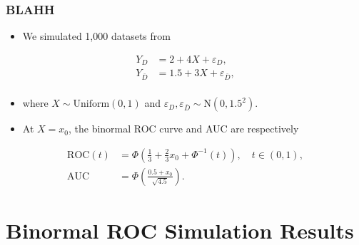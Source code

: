 \documentclass[t]{beamer}
\begin{document}
\begin{frame}
	\frametitle{BLAHH}
	\begin{itemize}
		\item We simulated 1,000 datasets from
	\end{itemize}
\begin{align*}
Y_D &= 2 + 4X + \varepsilon_D, \\
Y_{\bar{D}} &= 1.5 + 3X + \varepsilon_{\bar{D}}, \\
\end{align*}
\vspace{-.4in}
\begin{itemize}
	\item[] where $X \sim \text{Uniform}(0, 1)$ and $\varepsilon_{D}, \varepsilon_{\bar{D}} \sim \text{N}(0, 1.5^2)$.
	\item At $X = x_0$, the binormal ROC curve and AUC are respectively 
\end{itemize}
\begin{align*}
\text{ROC}(t) &= \Phi\left(\frac{1}{3} + \frac{2}{3}x_0 + \Phi^{-1}(t)\right), \quad t \in (0, 1), \\
\text{AUC} &= \Phi\left(\frac{0.5 + x_0}{\sqrt{4.5}}\right).
\end{align*}
\end{frame}

\section{Binormal ROC Simulation Results}
\end{document}

